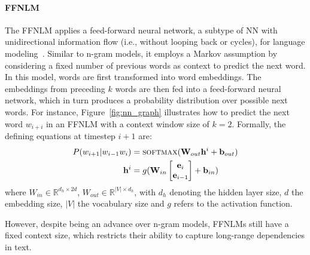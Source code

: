\vspace{-0.5\baselineskip}
\paragraph{\ac{FFNLM}} The FFNLM applies a feed-forward neural network, a subtype of NN with unidirectional information flow (i.e., without looping back or cycles), for language modeling~\citep{ffnlm_bengio}. Similar to n-gram models, it employs a Markov assumption by considering a fixed number of previous words as context to predict the next word. In this model, words are first transformed into word embeddings. The embeddings from preceding $k$ words are then fed into a feed-forward neural network, which in turn produces a probability distribution over possible next words. For instance, Figure~\ref{fig:nn_graph} illustrates how to predict the next word $w_{i+i}$ in an FFNLM with a context window size of $k=2$. Formally, the defining equations at timestep $i+1$ are:
\begin{align}
      P(w_{i+1}|w_{i-1}w_{i}) &= \textsc{softmax}({\mathbf W}_{out}{\mathbf h}^{i}+{\mathbf b}_{out}) \nonumber \\
      {\mathbf h}^{i} &= g( {\mathbf W}_{in}
                 \begin{bmatrix}
                   {\mathbf e}_{i}\\
                   {\mathbf e}_{i-1}
                   \end{bmatrix}+{\mathbf b}_{in})
\end{align}
\noindent where $W_{in} \in \mathbb{R}^{d_h \times 2d}$, $W_{out} \in \mathbb{R}^{|V| \times d_h}$, with $d_h$ denoting the hidden layer size, $d$ the embedding size, $|V|$ the vocabulary size and $g$ refers to the activation function.

However, despite being an advance over n-gram models, FFNLMs still have a fixed context size, which restricts their ability to capture long-range dependencies in text.

